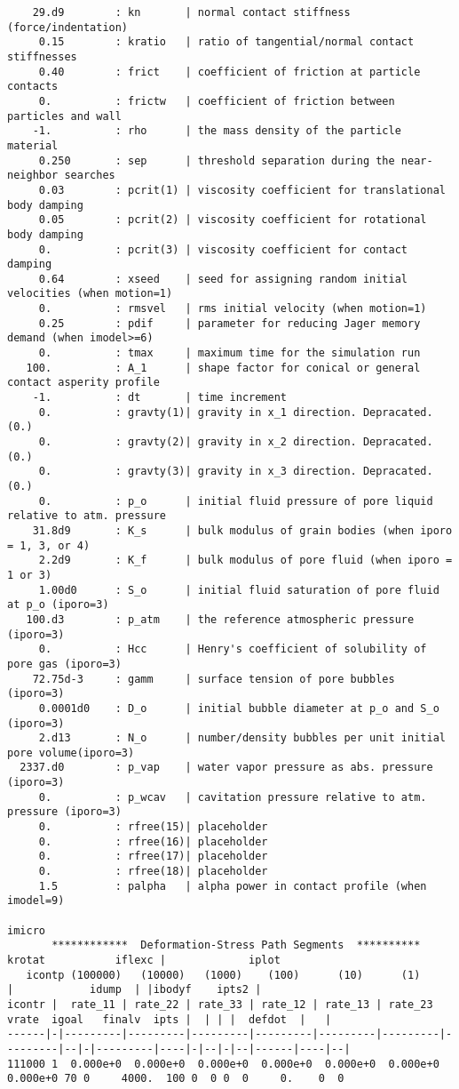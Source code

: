 \begin{verbatim}
    29.d9        : kn       | normal contact stiffness (force/indentation)
     0.15        : kratio   | ratio of tangential/normal contact stiffnesses
     0.40        : frict    | coefficient of friction at particle contacts
     0.          : frictw   | coefficient of friction between particles and wall
    -1.          : rho      | the mass density of the particle material
     0.250       : sep      | threshold separation during the near-neighbor searches
     0.03        : pcrit(1) | viscosity coefficient for translational body damping
     0.05        : pcrit(2) | viscosity coefficient for rotational body damping
     0.          : pcrit(3) | viscosity coefficient for contact damping
     0.64        : xseed    | seed for assigning random initial velocities (when motion=1)
     0.          : rmsvel   | rms initial velocity (when motion=1)
     0.25        : pdif     | parameter for reducing Jager memory demand (when imodel>=6)
     0.          : tmax     | maximum time for the simulation run
   100.          : A_1      | shape factor for conical or general contact asperity profile
    -1.          : dt       | time increment
     0.          : gravty(1)| gravity in x_1 direction. Depracated. (0.)
     0.          : gravty(2)| gravity in x_2 direction. Depracated. (0.)
     0.          : gravty(3)| gravity in x_3 direction. Depracated. (0.)
     0.          : p_o      | initial fluid pressure of pore liquid relative to atm. pressure
    31.8d9       : K_s      | bulk modulus of grain bodies (when iporo = 1, 3, or 4)
     2.2d9       : K_f      | bulk modulus of pore fluid (when iporo = 1 or 3)
     1.00d0      : S_o      | initial fluid saturation of pore fluid at p_o (iporo=3)
   100.d3        : p_atm    | the reference atmospheric pressure (iporo=3)
     0.          : Hcc      | Henry's coefficient of solubility of pore gas (iporo=3)
    72.75d-3     : gamm     | surface tension of pore bubbles (iporo=3)
     0.0001d0    : D_o      | initial bubble diameter at p_o and S_o (iporo=3)
     2.d13       : N_o      | number/density bubbles per unit initial pore volume(iporo=3)
  2337.d0        : p_vap    | water vapor pressure as abs. pressure (iporo=3)
     0.          : p_wcav   | cavitation pressure relative to atm. pressure (iporo=3)
     0.          : rfree(15)| placeholder
     0.          : rfree(16)| placeholder
     0.          : rfree(17)| placeholder
     0.          : rfree(18)| placeholder
     1.5         : palpha   | alpha power in contact profile (when imodel=9)
                                                                                                   imicro
       ************  Deformation-Stress Path Segments  **********             krotat           iflexc |             iplot
   icontp (100000)   (10000)   (1000)    (100)      (10)      (1)                 |            idump  | |ibodyf    ipts2 |
icontr |  rate_11 | rate_22 | rate_33 | rate_12 | rate_13 | rate_23    vrate  igoal   finalv  ipts |  | | |  defdot  |   |
------|-|---------|---------|---------|---------|---------|---------|---------|--|-|---------|----|-|--|-|--|------|----|--|
111000 1  0.000e+0  0.000e+0  0.000e+0  0.000e+0  0.000e+0  0.000e+0  0.000e+0 70 0     4000.  100 0  0 0  0     0.    0  0
\end{verbatim}
